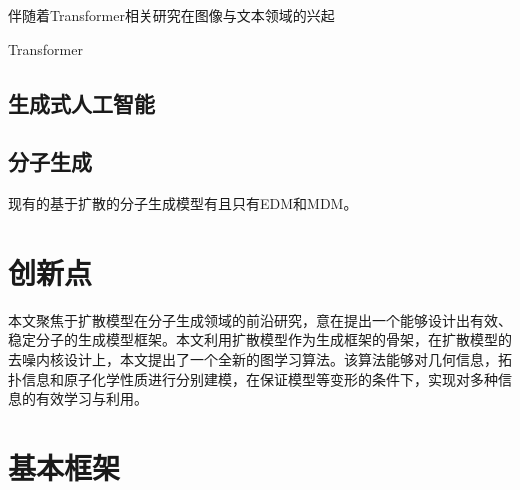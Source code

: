 伴随着Transformer\cite{transformer_vaswani_17}相关研究在图像与文本领域的兴起

Transformer \cite{smilestrans_honda_19,smilesbert_wang_19,chemberta_chithrananda_20}

\subsection{生成式人工智能}

\subsection{分子生成}
现有的基于扩散的分子生成模型有且只有EDM\cite{edm_hoogeboom_22}和MDM\cite{mdm_huang_22}。
 
\section{创新点}
本文聚焦于扩散模型在分子生成领域的前沿研究，意在提出一个能够设计出有效、稳定分子的生成模型框架。本文利用扩散模型作为生成框架的骨架，在扩散模型的去噪内核设计上，本文提出了一个全新的图学习算法。该算法能够对几何信息，拓扑信息和原子化学性质进行分别建模，在保证模型等变形的条件下，实现对多种信息的有效学习与利用。

\section{基本框架}